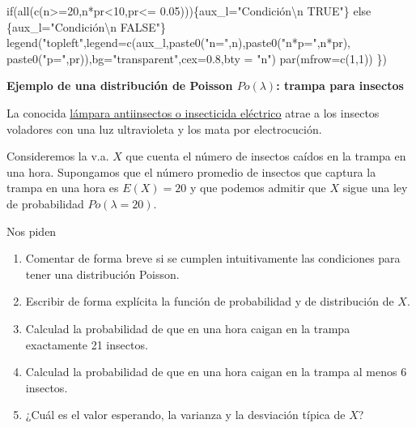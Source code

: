 \documentclass[
  letterpaper,
  DIV=11,
  numbers=noendperiod]{scrreprt}
\newenvironment{Shaded}{\begin{snugshade}}{\end{snugshade}}
\newcommand{\AttributeTok}[1]{\textcolor[rgb]{0.40,0.45,0.13}{#1}}
\newcommand{\ControlFlowTok}[1]{\textcolor[rgb]{0.00,0.23,0.31}{#1}}
\newcommand{\DecValTok}[1]{\textcolor[rgb]{0.68,0.00,0.00}{#1}}
\newcommand{\FloatTok}[1]{\textcolor[rgb]{0.68,0.00,0.00}{#1}}
\newcommand{\FunctionTok}[1]{\textcolor[rgb]{0.28,0.35,0.67}{#1}}
\newcommand{\NormalTok}[1]{\textcolor[rgb]{0.00,0.23,0.31}{#1}}
\newcommand{\OtherTok}[1]{\textcolor[rgb]{0.00,0.23,0.31}{#1}}
\newcommand{\SpecialCharTok}[1]{\textcolor[rgb]{0.37,0.37,0.37}{#1}}
\newcommand{\StringTok}[1]{\textcolor[rgb]{0.13,0.47,0.30}{#1}}
\providecommand{\tightlist}{%
  \setlength{\itemsep}{0pt}\setlength{\parskip}{0pt}}\usepackage{longtable,booktabs,array}
\begin{document}
\begin{Shaded}
\begin{Highlighting}[]
  \ControlFlowTok{if}\NormalTok{(}\FunctionTok{all}\NormalTok{(}\FunctionTok{c}\NormalTok{(n}\SpecialCharTok{\textgreater{}=}\DecValTok{20}\NormalTok{,n}\SpecialCharTok{*}\NormalTok{pr}\SpecialCharTok{\textless{}}\DecValTok{10}\NormalTok{,pr}\SpecialCharTok{\textless{}=} \FloatTok{0.05}\NormalTok{)))\{aux\_l}\OtherTok{=}\StringTok{"Condición}\SpecialCharTok{\textbackslash{}n}\StringTok{ TRUE"}\NormalTok{\} }\ControlFlowTok{else} 
\NormalTok{    \{aux\_l}\OtherTok{=}\StringTok{"Condición}\SpecialCharTok{\textbackslash{}n}\StringTok{ FALSE"}\NormalTok{\}}
  \FunctionTok{legend}\NormalTok{(}\StringTok{"topleft"}\NormalTok{,}\AttributeTok{legend=}\FunctionTok{c}\NormalTok{(aux\_l,}\FunctionTok{paste0}\NormalTok{(}\StringTok{"n="}\NormalTok{,n),}\FunctionTok{paste0}\NormalTok{(}\StringTok{"n*p="}\NormalTok{,n}\SpecialCharTok{*}\NormalTok{pr),}
                            \FunctionTok{paste0}\NormalTok{(}\StringTok{"p="}\NormalTok{,pr)),}\AttributeTok{bg=}\StringTok{"transparent"}\NormalTok{,}\AttributeTok{cex=}\FloatTok{0.8}\NormalTok{,}\AttributeTok{bty =} \StringTok{"n"}\NormalTok{)}
  \FunctionTok{par}\NormalTok{(}\AttributeTok{mfrow=}\FunctionTok{c}\NormalTok{(}\DecValTok{1}\NormalTok{,}\DecValTok{1}\NormalTok{))}
\NormalTok{\})}
\end{Highlighting}
\end{Shaded}

\textbf{Ejemplo de una distribución de Poisson \(Po(\lambda)\): trampa
para insectos}

La conocida
\href{https://es.wikipedia.org/wiki/Insecticida_el\%C3\%A9ctrico}{lámpara
antiinsectos o insecticida eléctrico} atrae a los insectos voladores con
una luz ultravioleta y los mata por electrocución.

Consideremos la v.a. \(X\) que cuenta el número de insectos caídos en la
trampa en una hora. Supongamos que el número promedio de insectos que
captura la trampa en una hora es \(E(X)=20\) y que podemos admitir que
\(X\) sigue una ley de probabilidad \(Po(\lambda=20)\).

Nos piden

\begin{enumerate}
\def\labelenumi{\arabic{enumi}.}
\tightlist
\item
  Comentar de forma breve si se cumplen intuitivamente las condiciones
  para tener una distribución Poisson.
\item
  Escribir de forma explícita la función de probabilidad y de
  distribución de \(X\).
\item
  Calculad la probabilidad de que en una hora caigan en la trampa
  exactamente 21 insectos.
\item
  Calculad la probabilidad de que en una hora caigan en la trampa al
  menos 6 insectos.
\item
  ¿Cuál es el valor esperando, la varianza y la desviación típica de
  \(X\)?
\end{enumerate}
\end{document}
